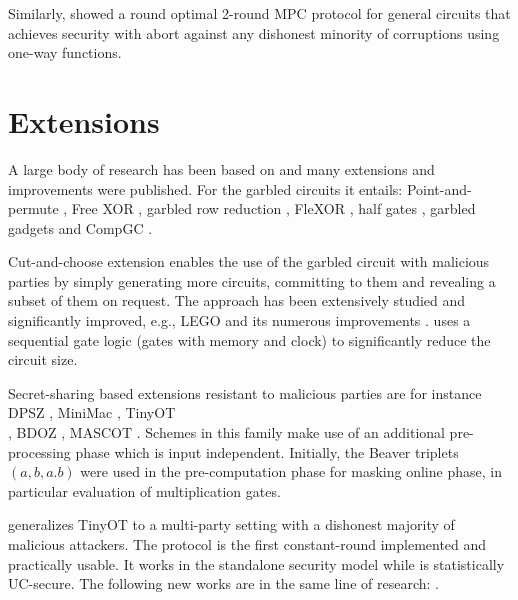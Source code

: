 \documentclass[
  digital, %
  twoside, %
  table,   %
  lof,     %
  lot,     %
]{fithesis3}
\newcounter{ph4_show_guides}
\theoremstyle{definition}
\theoremstyle{remark}
\begin{document}
Similarly, \cite{cryptoeprint:2018:572} showed a round optimal 2-round MPC protocol for general circuits that achieves security with abort against any dishonest minority of corruptions using one-way functions.

\section{Extensions}\label{sec:soa:extensions}%
A large body of research has been based on \cite{Yao86, GMW87, BGW88, CCD88} and many extensions and improvements were published. 
For the garbled circuits it entails: Point-and-permute \cite{BMR90}, Free XOR \cite{KS08}, garbled row reduction \cite{NPS99, PSSW09}, FleXOR \cite{KMR14}, half gates \cite{ZRE14}, garbled gadgets \cite{BMR16} and CompGC \cite{cryptoeprint:2016:458}.

Cut-and-choose extension \cite{LP07,LP11,Lin16} enables the use of the garbled circuit with malicious parties by simply generating more circuits, committing to them and revealing a subset of them on request. The approach has been extensively studied and significantly improved, e.g., LEGO \cite{NO09} and its numerous improvements \cite{cryptoeprint:2013:155, FJNT15, cryptoeprint:2016:1069, cryptoeprint:2017:226, KNBTR17, cryptoeprint:2018:578}.
\cite{SHSSK15} uses a sequential gate logic (gates with memory and clock) to significantly reduce the circuit size. %

Secret-sharing based extensions resistant to malicious parties are for instance DPSZ \cite{DPSZ12, cryptoeprint:2012:642}, MiniMac \cite{DZ13}, TinyOT \\\cite{NNOB12}, BDOZ \cite{BDOZ11}, MASCOT \cite{KOS16}. Schemes in this family make use of an additional pre-processing phase which is input independent. Initially, the Beaver triplets \cite{B91a} $(a,b,a.b)$ were used in the pre-computation phase for masking online phase, in particular evaluation of multiplication gates.

\cite{WRK17} generalizes TinyOT to a multi-party setting with a dishonest majority of malicious attackers. The protocol is the first constant-round implemented and practically usable. It works in the standalone security model while \cite{DPSZ12} is statistically UC-secure. The following new works are in the same line of research: \cite{FKOS15, DZ16, LPJ17, BCGIM17, cryptoeprint:2017:1230}.
%
\end{document}
